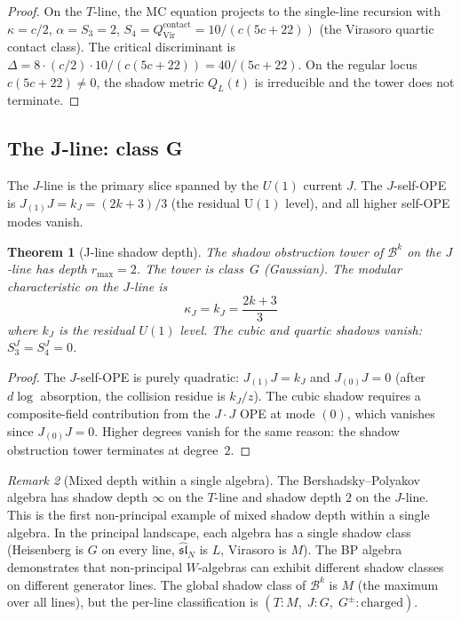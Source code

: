 \documentclass[11pt]{article}
\theoremstyle{plain}
\newtheorem{theorem}{Theorem}[section]
\theoremstyle{definition}
\theoremstyle{remark}
\newtheorem{remark}[theorem]{Remark}
\newcommand{\fsl}{\mathfrak{sl}}
\newcommand{\cB}{\mathcal{B}}
\newcommand{\Vir}{\mathrm{Vir}}
\numberwithin{equation}{section}
\begin{document}
\begin{proof}
On the $T$-line, the MC equation projects to the single-line
recursion with $\kappa = c/2$, $\alpha = S_3 = 2$, $S_4 = Q^{\mathrm{contact}}_{\Vir}
= 10/(c(5c+22))$ (the Virasoro quartic contact class). The critical
discriminant is $\Delta = 8 \cdot (c/2) \cdot 10/(c(5c+22)) =
40/(5c+22)$. On the regular locus $c(5c+22)\ne0$, the shadow metric
$Q_L(t)$ is irreducible and the tower does not terminate.
\end{proof}

\subsection{The J-line: class G}

The $J$-line is the primary slice spanned by the $U(1)$ current $J$.
The $J$-self-OPE is $J_{(1)}J = k_J = (2k+3)/3$
(the residual $\mathrm{U}(1)$ level), and all
higher self-OPE modes vanish.

\begin{theorem}[J-line shadow depth]\label{thm:j-line-depth}
The shadow obstruction tower of $\cB^k$ on the $J$-line has depth
$r_{\max} = 2$. The tower is class~$G$ (Gaussian). The modular
characteristic on the $J$-line is
\begin{equation}\label{eq:j-line-kappa}
 \kappa_J = k_J = \frac{2k+3}{3}
\end{equation}
where $k_J$ is the residual $U(1)$ level. The cubic
and quartic shadows vanish: $S_3^J = S_4^J = 0$.
\end{theorem}

\begin{proof}
The $J$-self-OPE is purely quadratic: $J_{(1)}J = k_J$
and $J_{(0)}J = 0$ (after $d\log$ absorption, the collision residue
is $k_J/z$). The cubic shadow requires a
composite-field contribution from the $J \cdot J$ OPE at mode $(0)$,
which vanishes since $J_{(0)}J = 0$. Higher degrees vanish for the
same reason: the shadow obstruction tower terminates at degree~$2$.
\end{proof}

\begin{remark}[Mixed depth within a single algebra]\label{rem:mixed-depth}
The Bershadsky--Polyakov algebra has shadow depth $\infty$ on the
$T$-line and shadow depth $2$ on the $J$-line. This is the first
non-principal example of mixed shadow depth within a single algebra.
In the principal landscape, each algebra has a single shadow class
(Heisenberg is $G$ on every line, $\widehat{\fsl}_N$ is $L$,
Virasoro is $M$). The BP algebra demonstrates that non-principal
$W$-algebras can exhibit different shadow classes on different
generator lines. The global shadow class of $\cB^k$ is $M$
(the maximum over all lines), but the per-line classification is
$(T: M,\; J: G,\; G^\pm: \text{charged})$.
\end{remark}
\end{document}
